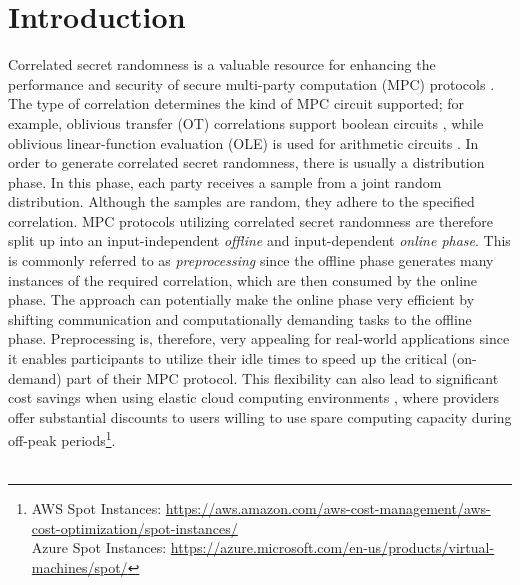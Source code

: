 \chapter{Introduction}
Correlated secret randomness is a valuable resource for enhancing the performance and security of secure multi-party computation (MPC) protocols \cite{ishai2013power}. The type of correlation determines the kind of MPC circuit supported; for example, oblivious transfer (OT) correlations support boolean circuits \cite{goldreich2019play}, while oblivious linear-function evaluation (OLE) is used for arithmetic circuits \cite{ishai2009secure}. In order to generate correlated secret randomness, there is usually a distribution phase. In this phase, each party receives a sample from a joint random distribution. Although the samples are random, they adhere to the specified correlation. MPC protocols utilizing correlated secret randomness are therefore split up into an input-independent \textit{offline} and input-dependent \textit{online phase}. This is commonly referred to as \textit{preprocessing} since the offline phase generates many instances of the required correlation, which are then consumed by the online phase. The approach can potentially make the online phase very efficient by shifting communication and computationally demanding tasks to the offline phase. Preprocessing is, therefore, very appealing for real-world applications since it enables participants to utilize their idle times to speed up the critical (on-demand) part of their MPC protocol. This flexibility can also lead to significant cost savings when using elastic cloud computing environments \cite{coutinho2015elasticity}, where providers offer substantial discounts to users willing to use spare computing capacity during off-peak periods\footnote{AWS Spot Instances: \url{https://aws.amazon.com/aws-cost-management/aws-cost-optimization/spot-instances/} \\ Azure Spot Instances: \url{https://azure.microsoft.com/en-us/products/virtual-machines/spot/}}.
\\\\
